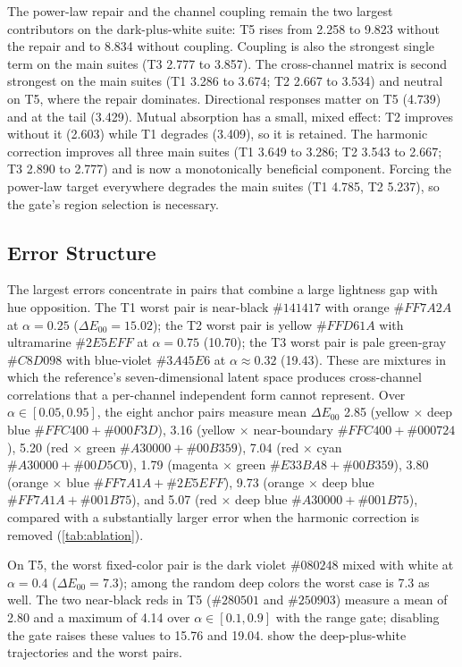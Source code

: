 The power-law repair and the channel coupling remain the two largest contributors on the dark-plus-white suite: T5 rises from 2.258 to 9.823 without the repair and to 8.834 without coupling. Coupling is also the strongest single term on the main suites (T3 2.777 to 3.857). The cross-channel matrix is second strongest on the main suites (T1 3.286 to 3.674; T2 2.667 to 3.534) and neutral on T5, where the repair dominates. Directional responses matter on T5 (4.739) and at the tail (3.429). Mutual absorption has a small, mixed effect: T2 improves without it (2.603) while T1 degrades (3.409), so it is retained. The harmonic correction improves all three main suites (T1 3.649 to 3.286; T2 3.543 to 2.667; T3 2.890 to 2.777) and is now a monotonically beneficial component. Forcing the power-law target everywhere degrades the main suites (T1 4.785, T2 5.237), so the gate's region selection is necessary.

\subsection{Error Structure}
\label{sec:errors}

The largest errors concentrate in pairs that combine a large lightness gap with hue opposition. The T1 worst pair is near-black $\#141417$ with orange $\#FF7A2A$ at $\alpha=0.25$ ($\Delta E_{00}=15.02$); the T2 worst pair is yellow $\#FFD61A$ with ultramarine $\#2E5EFF$ at $\alpha=0.75$ (10.70); the T3 worst pair is pale green-gray $\#C8D098$ with blue-violet $\#3A45E6$ at $\alpha\approx0.32$ (19.43). These are mixtures in which the reference's seven-dimensional latent space produces cross-channel correlations that a per-channel independent form cannot represent. Over $\alpha\in[0.05,0.95]$, the eight anchor pairs measure mean $\Delta E_{00}$ 2.85 (yellow $\times$ deep blue $\#FFC400+\#000F3D$), 3.16 (yellow $\times$ near-boundary $\#FFC400+\#000724$), 5.20 (red $\times$ green $\#A30000+\#00B359$), 7.04 (red $\times$ cyan $\#A30000+\#00D5C0$), 1.79 (magenta $\times$ green $\#E33BA8+\#00B359$), 3.80 (orange $\times$ blue $\#FF7A1A+\#2E5EFF$), 9.73 (orange $\times$ deep blue $\#FF7A1A+\#001B75$), and 5.07 (red $\times$ deep blue $\#A30000+\#001B75$), compared with a substantially larger error when the harmonic correction is removed (\cref{tab:ablation}).

On T5, the worst fixed-color pair is the dark violet $\#080248$ mixed with white at $\alpha=0.4$ ($\Delta E_{00}=7.3$); among the random deep colors the worst case is 7.3 as well. The two near-black reds in T5 ($\#280501$ and $\#250903$) measure a mean of 2.80 and a maximum of 4.14 over $\alpha\in[0.1,0.9]$ with the range gate; disabling the gate raises these values to 15.76 and 19.04.  show the deep-plus-white trajectories and the worst pairs.

